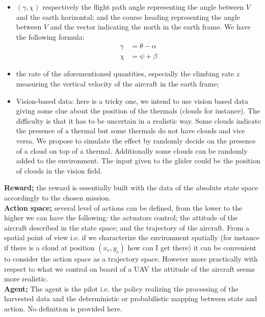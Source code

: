 \documentclass[]{article}
\begin{document}
\begin{itemize}
	\item $(\gamma, \chi)$ respectively the flight path angle representing the angle between $V$ and the earth horizontal; and the course heading representing the angle between $V$ and the vector indicating the north in the earth frame. We have the following formula:
	\begin{align*}
		\gamma &= \theta - \alpha \\
		\chi &= \psi + \beta
	\end{align*}
	
	\item the rate of the aforementioned quantities, especially the climbing rate $\dot{z}$ measuring the vertical velocity of the aircraft in the earth frame;
	
	\item Vision-based data: here is a tricky one, we intend to use vision based data giving some clue about the position of the thermals (clouds for instance). The difficulty is that it has to be uncertain in a realistic way. Some clouds indicate the presence of a thermal but some thermals do not have clouds and vice versa. We propose to simulate the effect by randomly decide on the presence of a cloud on top of a thermal. Additionally some clouds can be randomly added to the environment. The input given to the glider could be the position of clouds in the vision field.
\end{itemize}

\noindent \textbf{Reward;} the reward is essentially built with the data of the absolute state space accordingly to the chosen mission.\\

\noindent \textbf{Action space;} several level of actions can be defined, from the lower to the higher we can have the following: the actuators control; the attitude of the aircraft described in the state space; and the trajectory of the aircraft. From a spatial point of view i.e. if we characterize the environment spatially (for instance if there is a cloud at position $(x_c,y_c)$ how can I get there) it can be convenient to consider the action space as a trajectory space. However more practically with respect to what we control on board of a UAV the attitude of the aircraft seems more realistic.\\

\noindent \textbf{Agent;} The agent is the pilot i.e. the policy realizing the processing of the harvested data and the deterministic or probabilistic mapping between state and action. No definition is provided here.\\
\end{document}
